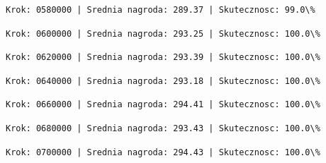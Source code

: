 \documentclass[11pt]{article}
\begin{document}
    
    
    \begin{Verbatim}[commandchars=\\\{\}]
Krok: 0580000 | Srednia nagroda: 289.37 | Skutecznosc: 99.0\%

    \end{Verbatim}

    
    
    \begin{Verbatim}[commandchars=\\\{\}]
Krok: 0600000 | Srednia nagroda: 293.25 | Skutecznosc: 100.0\%

    \end{Verbatim}

    
    
    \begin{Verbatim}[commandchars=\\\{\}]
Krok: 0620000 | Srednia nagroda: 293.39 | Skutecznosc: 100.0\%

    \end{Verbatim}

    
    
    \begin{Verbatim}[commandchars=\\\{\}]
Krok: 0640000 | Srednia nagroda: 293.18 | Skutecznosc: 100.0\%

    \end{Verbatim}

    
    
    \begin{Verbatim}[commandchars=\\\{\}]
Krok: 0660000 | Srednia nagroda: 294.41 | Skutecznosc: 100.0\%

    \end{Verbatim}

    
    
    \begin{Verbatim}[commandchars=\\\{\}]
Krok: 0680000 | Srednia nagroda: 293.43 | Skutecznosc: 100.0\%

    \end{Verbatim}

    
    
    \begin{Verbatim}[commandchars=\\\{\}]
Krok: 0700000 | Srednia nagroda: 294.43 | Skutecznosc: 100.0\%

    \end{Verbatim}
\end{document}

